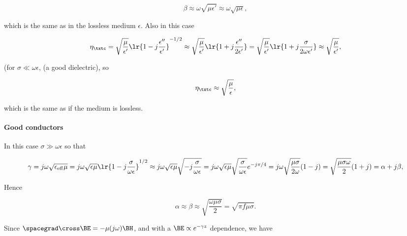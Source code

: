 \begin{dmath}\label{eqn:uwavesLecture3:360}
\beta
\approx
\omega \sqrt{\mu \epsilon'}
\approx
\omega \sqrt{\mu \epsilon},
\end{dmath}

which is the same as in the lossless medium \( \epsilon \).  Also in this case

\begin{dmath}\label{eqn:uwavesLecture3:380}
\eta_\txtc 
=
\sqrt{\frac{\mu}{\epsilon'}} \lr{ 1 - j \frac{\epsilon''}{\epsilon'} }^{-1/2}
\approx
\sqrt{\frac{\mu}{\epsilon'}} \lr{ 1 + j \frac{\epsilon''}{2 \epsilon'} }
=
\sqrt{\frac{\mu}{\epsilon'}} \lr{ 1 + j \frac{\sigma}{2 \omega \epsilon'} }
\approx
\sqrt{\frac{\mu}{\epsilon'}},
\end{dmath}

(for \( \sigma \ll \omega \epsilon \), (a good dielectric), so 

\begin{dmath}\label{eqn:uwavesLecture3:400}
\eta_\txtc \approx \sqrt{\frac{\mu}{\epsilon}},
\end{dmath}

which is the same as if the medium is lossless.

\paragraph{Good conductors}

In this case \( \sigma \gg \omega \epsilon \) so that

\begin{dmath}\label{eqn:uwavesLecture3:420}
\gamma 
= 
j \omega \sqrt{ \epsilon_{\mathrm{eff}} \mu }
= 
j \omega \sqrt{ \epsilon \mu } \lr{ 1 - j \frac{\sigma}{\omega \epsilon} }^{1/2}
\approx
j \omega \sqrt{ \epsilon \mu } \sqrt{- j \frac{\sigma}{\omega \epsilon} }
=
j \omega \sqrt{ \epsilon \mu } \sqrt{\frac{\sigma}{\omega \epsilon} } e^{-j \pi/4}
=
j \omega \sqrt{ \frac{ \mu \sigma}{2 \omega} } ( 1 - j )
=
\sqrt{ \frac{ \mu \sigma \omega}{2 } } ( 1 + j )
= \alpha + j \beta,
\end{dmath}

Hence 

\begin{equation}\label{eqn:uwavesLecture3:440}
\alpha \approx \beta \approx \sqrt{\frac{\omega \mu \sigma}{2}} = \sqrt{ \pi f \mu \sigma }.
\end{equation}

Since \( \spacegrad \cross \BE = - \mu (j \omega) \BH \), and with a \( \BE \propto e^{-\gamma z } \) dependence, we have

